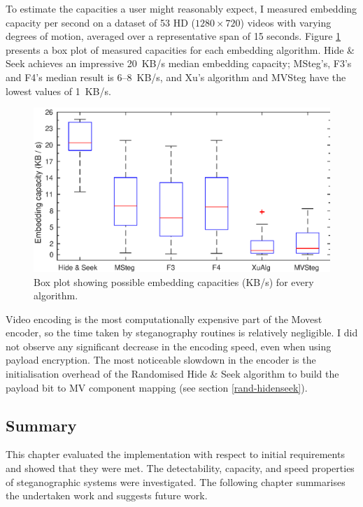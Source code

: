 \documentclass[12pt,british,twoside,notitlepage,usenames,dvipsnames,hypens,final]{report}
\numberwithin{equation}{section}
\numberwithin{figure}{section}
\begin{document}
To estimate the capacities a user might reasonably expect, I measured embedding capacity per second on a dataset of 53 HD ($1280 \times 720$) videos with varying degrees of motion, averaged over a representative span of 15 seconds. Figure \ref{fig:capacities} presents a box plot of measured capacities for each embedding algorithm. Hide \& Seek achieves an impressive 20~KB/s median embedding capacity; MSteg's, F3's and F4's median result is 6--8~KB/s, and Xu's algorithm and MVSteg have the lowest values of 1~KB/s. 

\begin{figure}[tbh]
\centerline{\includegraphics{img/capacities.eps}}
\caption{Box plot showing possible embedding capacities (KB/s) for every algorithm.}
\label{fig:capacities}
\end{figure}

Video encoding is the most computationally expensive part of the Movest encoder, so the time taken by steganography routines is relatively negligible. I did not observe any significant decrease in the encoding speed, even when using payload encryption. The most noticeable slowdown in the encoder is the initialisation overhead of the Randomised Hide \& Seek algorithm to build the payload bit to MV component mapping (see section \ref{rand-hidenseek}).

\bigskip\bigskip
\subsection*{Summary}
This chapter evaluated the implementation with respect to initial requirements and showed that they were met. The detectability, capacity, and speed properties of steganographic systems were investigated. The following chapter summarises the undertaken work and suggests future work.
\end{document}
